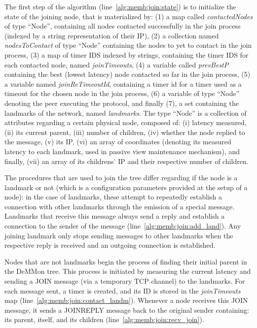 

The first step of the algorithm (line~\ref{alg:memb:join:state}) is to initialize the state of the joining node, that is materialized by: (1) a map called \textit{contactedNodes} of type ``Node'', containing all nodes contacted successfully in the join process (indexed by a string representation of their IP), (2) a collection named \textit{nodesToContact} of type ``Node'' containing the nodes to yet to contact in the join process, (3) a map of timer IDS indexed by strings, containing the timer IDS for each contacted node, named \textit{joinTimeouts}, (4) a variable called \textit{prevBestP} containing the best (lowest latency) node contacted so far in the join process, (5) a variable named \textit{joinReTimeoutId}, containing a timer id for a timer used as a timeout for the chosen node in the join process, (6) a variable of type ``Node'' denoting the peer executing the protocol, and finally (7), a set containing the landmarks of the network, named \textit{landmarks}. The type ``Node'' is a collection of attributes regarding a certain physical node, composed of: (i) latency measured, (ii) its current parent, (iii) number of children, (iv) whether the node replied to the message, (v) its IP, (vi) an array of coordinates (denoting its measured latency to each landmark, used in passive view maintenance mechanism), and finally, (vii) an array of its childrens' IP and their respective number of children.
 
The procedures that are used to join the tree differ regarding if the node is a landmark or not (which is a configuration parameters provided at the setup of a node): in the case of landmarks, these attempt to repeatedly establish a connection with other landmarks through the emission of a special message. Landmarks that receive this message always send a reply and establish a connection to the sender of the message (line~\ref{alg:memb:join:add_land}). Any joining landmark only stops sending messages to other landmarks when the respective reply is received and an outgoing connection is established.

Nodes that are not landmarks begin the process of finding their initial parent in the DeMMon tree. This process is initiated by measuring the current latency and sending a JOIN message (via a temporary TCP channel) to the landmarks. For each message sent, a timer is created, and its ID is stored in the \textit{joinTimeouts} map (line~\ref{alg:memb:join:contact_landm}). Whenever a node receives this JOIN message, it sends a JOINREPLY message back to the original sender containing: its parent, itself, and its children (line~\ref{alg:memb:join:recv_join}).

